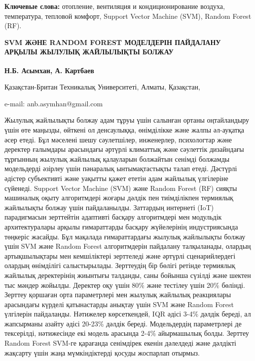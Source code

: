 {\bfseries Ключевые слова:} отопление, вентиляция и кондиционирование
воздуха, температура, тепловой комфорт, Support Vector Machine (SVM),
Random Forest (RF).

\begin{articleheader}
{\bfseries SVM ЖӘНЕ RANDOM FOREST МОДЕЛДЕРІН ПАЙДАЛАНУ АРҚЫЛЫ ЖЫЛУЛЫҚ ЖАЙЛЫЛЫҚТЫ БОЛЖАУ}

{\bfseries Н.Б. Асымхан\textsuperscript{\envelope }, А. Картбаев}
\end{articleheader}

\begin{affiliation}
Қазақстан-Британ Техникалық Университеті, Алматы, Қазақстан,

e-mail: anb.asymhan@gmail.com
\end{affiliation}

Жылулық жайлылықты болжау адам тұруы үшін салынған ортаны оңтайландыру
үшін өте маңызды, өйткені ол денсаулыққа, өнімділікке және жалпы
әл-ауқатқа әсер етеді. Бұл мәселені шешу сәулетшілер, инженерлер,
психологтар және деректер ғалымдары арасындағы әртүрлі климаттық және
сәулеттік дизайндағы тұрғынның жылулық жайлылық қалауларын болжайтын
сенімді болжамды модельдерді әзірлеу үшін пәнаралық ынтымақтастықты
талап етеді. Дәстүрлі әдістер субъективті және уақытты қажет ететін адам
жайлылық үлгілеріне сүйенеді. Support Vector Machine (SVM) және Random
Forest (RF) сияқты машиналық оқыту алгоритмдері жоғары дәлдік пен
тиімділікпен термиялық жайлылықты болжау үшін пайдаланылды. Заттардың
интернеті (IoT) парадигмасын зерттейтін адаптивті басқару алгоритмдері
мен модульдік архитектуралары арқылы ғимараттарды басқару жүйелерінің
индустриясында төңкеріс жасайды. Бұл мақалада ғимараттардағы жылулық
жайлылықты болжау үшін SVM және Random Forest алгоритмдерін пайдалану
талқыланады, олардың артықшылықтары мен кемшіліктері зерттеледі және
әртүрлі сценарийлердегі олардың өнімділігі салыстырылады. Зерттеудің бір
бөлігі ретінде термиялық жайлылық деректерінің жиынтығы талданды, саны
бойынша сүзілді және шектен тыс мәндер жойылды. Деректер оқу үшін 80\%
және тестілеу үшін 20\% бөлінді. Зерттеу қоршаған орта параметрлері мен
жылулық жайлылық реакциялары арасындағы күрделі қатынастарды анықтау
үшін SVM және Random Forest үлгілерін пайдаланды. Нәтижелер
көрсеткендей, IQR әдісі 3-4\% дәлдік береді, ал жапсырманы азайту әдісі
20-23\% дәлдік береді. Модельдердің параметрлері де тексерілді,
нәтижесінде екі модель арасында 2-4\% айырмашылық болды. Зерттеу Random
Forest SVM-ге қарағанда сенімдірек екенін дәлелдеді және дәлдікті
жақсарту үшін жаңа мүмкіндіктерді қосуды жоспарлап отырмыз.

